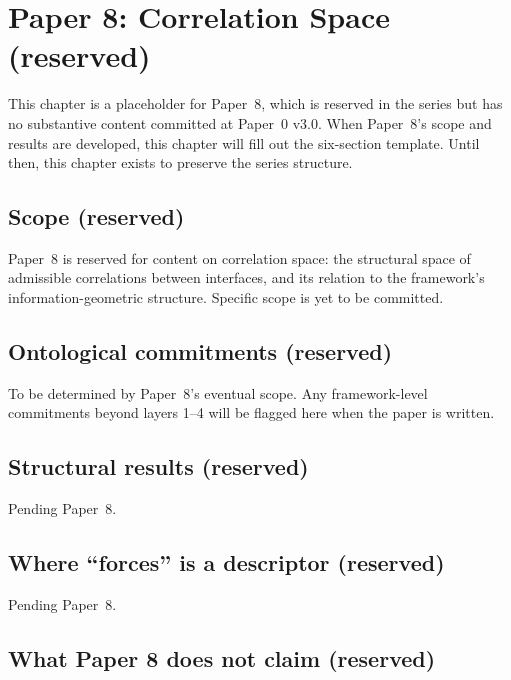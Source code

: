 \documentclass[11pt]{article}
\begin{document}
\section{Paper 8: Correlation Space (reserved)}\label{sec:P8}

\begin{tcolorbox}[pendingbox, title={Status: reserved slot}]
This chapter is a placeholder for Paper~8, which is reserved in the series but has no substantive content committed at Paper~0 v3.0. When Paper~8's scope and results are developed, this chapter will fill out the six-section template. Until then, this chapter exists to preserve the series structure.
\end{tcolorbox}

\subsection{Scope (reserved)}\label{sec:P8_scope}

Paper~8 is reserved for content on correlation space: the structural space of admissible correlations between interfaces, and its relation to the framework's information-geometric structure. Specific scope is yet to be committed.

\subsection{Ontological commitments (reserved)}\label{sec:P8_commitments}

To be determined by Paper~8's eventual scope. Any framework-level commitments beyond layers 1--4 will be flagged here when the paper is written.

\subsection{Structural results (reserved)}\label{sec:P8_results}

Pending Paper~8.

\subsection{Where ``forces'' is a descriptor (reserved)}\label{sec:P8_forces}

Pending Paper~8.

\subsection{What Paper 8 does not claim (reserved)}\label{sec:P8_does_not_claim}
\end{document}
